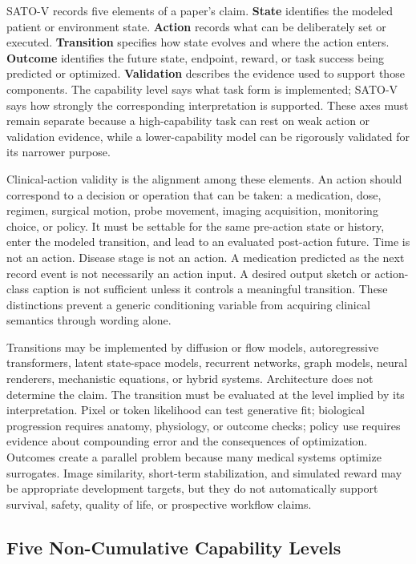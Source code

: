 SATO-V records five elements of a paper's claim. \textbf{State} identifies the modeled patient or environment state. \textbf{Action} records what can be deliberately set or executed. \textbf{Transition} specifies how state evolves and where the action enters. \textbf{Outcome} identifies the future state, endpoint, reward, or task success being predicted or optimized. \textbf{Validation} describes the evidence used to support those components. The capability level says what task form is implemented; SATO-V says how strongly the corresponding interpretation is supported. These axes must remain separate because a high-capability task can rest on weak action or validation evidence, while a lower-capability model can be rigorously validated for its narrower purpose.

Clinical-action validity is the alignment among these elements. An action should correspond to a decision or operation that can be taken: a medication, dose, regimen, surgical motion, probe movement, imaging acquisition, monitoring choice, or policy. It must be settable for the same pre-action state or history, enter the modeled transition, and lead to an evaluated post-action future. Time is not an action. Disease stage is not an action. A medication predicted as the next record event is not necessarily an action input. A desired output sketch or action-class caption is not sufficient unless it controls a meaningful transition. These distinctions prevent a generic conditioning variable from acquiring clinical semantics through wording alone.

Transitions may be implemented by diffusion or flow models, autoregressive transformers, latent state-space models, recurrent networks, graph models, neural renderers, mechanistic equations, or hybrid systems. Architecture does not determine the claim. The transition must be evaluated at the level implied by its interpretation. Pixel or token likelihood can test generative fit; biological progression requires anatomy, physiology, or outcome checks; policy use requires evidence about compounding error and the consequences of optimization. Outcomes create a parallel problem because many medical systems optimize surrogates. Image similarity, short-term stabilization, and simulated reward may be appropriate development targets, but they do not automatically support survival, safety, quality of life, or prospective workflow claims.



\subsection{Five Non-Cumulative Capability Levels}
\label{sec:levels}

